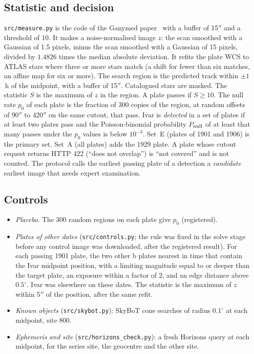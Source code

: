 \documentclass[11pt]{article}
\newcommand{\as}{$''$}
\begin{document}
\subsection{Statistic and decision}
\texttt{src/measure.py} is the code of the Ganymed paper~\cite{wu2026ganymed} with a buffer of 15\as{} and a threshold of 10. It makes a noise-normalised image $z$: the scan smoothed with a Gaussian of 1.5 pixels, minus the scan smoothed with a Gaussian of 15 pixels, divided by $1.4826$ times the median absolute deviation. It refits the plate WCS to ATLAS stars where three or more stars match (a shift for fewer than six matches, an affine map for six or more). The search region is the predicted track within $\pm1$\,h of the midpoint, with a buffer of 15\as. Catalogued stars are masked. The statistic $S$ is the maximum of $z$ in the region. A plate passes if $S\ge10$. The null rate $p_0$ of each plate is the fraction of 300 copies of the region, at random offsets of 90\as{} to 420\as{} on the same cutout, that pass. Ivar is \emph{detected} in a set of plates if at least two plates pass and the Poisson-binomial probability $P_{\rm null}$ of at least that many passes under the $p_0$ values is below $10^{-3}$. Set~E (plates of 1901 and 1906) is the primary set. Set~A (all plates) adds the 1929 plate. A plate whose cutout request returns HTTP 422 (``does not overlap'') is ``not covered'' and is not counted. The protocol calls the earliest passing plate of a detection a \emph{candidate} earliest image that needs expert examination.

\subsection{Controls}
\begin{itemize}
\item \emph{Placebo.} The 300 random regions on each plate give $p_0$ (registered).
\item \emph{Plates of other dates} (\texttt{src/controls.py}; the rule was fixed in the solve stage before any control image was downloaded, after the registered result). For each passing 1901 plate, the two other b plates nearest in time that contain the Ivar midpoint position, with a limiting magnitude equal to or deeper than the target plate, an exposure within a factor of 2, and an edge distance above $0.5^\circ$. Ivar was elsewhere on these dates. The statistic is the maximum of $z$ within 5\as{} of the position, after the same refit.
\item \emph{Known objects} (\texttt{src/skybot.py}): SkyBoT cone searches of radius $0.1^\circ$ at each midpoint, site 800.
\item \emph{Ephemeris and site} (\texttt{src/horizons\_check.py}): a fresh Horizons query at each midpoint, for the series site, the geocentre and the other site.
\end{itemize}
\end{document}
